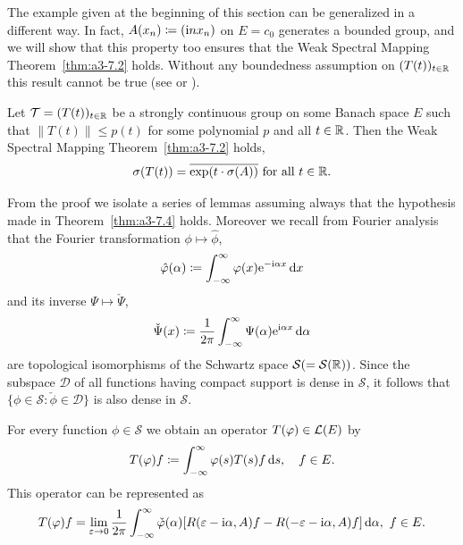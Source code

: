 The example given at the beginning of this section can be generalized in a different way.
In fact, $A(x_{n}) \coloneq (\mathrm{i} nx_{n})$ on $E = c_{0}$ generates a bounded group, and we will show that this property too ensures that the Weak Spectral Mapping Theorem~\ref{thm:a3-7.2} holds.
Without any boundedness assumption on $(T(t))_{t\in\mathbb{R}}$ this result cannot be true (see \textcite[Sec.23.16]{hillephillips:1957} or \textcite{wolff:1981}).
\begin{theorem}\label{thm:a3-7.4}
Let $\mathcal{T} = (T(t))_{t\in\mathbb{R}}$ be a strongly continuous group on some Banach space $E$ such that $\|T(t)\| \leq p(t)$ for some polynomial $p$ and all $t \in \mathbb{R}$.
Then the Weak Spectral Mapping Theorem~\ref{thm:a3-7.2} holds, \ie 
\[
\sigma(T(t)) = \overline{\exp(t\cdot\sigma(A))} \text{ for all } t \in \mathbb{R} .
\]
\end{theorem}
From the proof we isolate a series of lemmas assuming always that the hypothesis made in Theorem~\ref{thm:a3-7.4} holds.
Moreover we recall from Fourier analysis that the Fourier transformation $\phi \mapsto \hat{\phi}$,
\[
\hat{\phi}(\alpha) \coloneq \int_{-\infty}^{\infty} \phi(x)\eu^{-\im\alpha x} \dx
\]
and its inverse $\Psi \mapsto \check{\Psi}$,
\[
\check{\Psi}(x) \coloneq \frac{1}{2\pi}\int_{-\infty}^{\infty}\Psi(\alpha)\mathrm{e}^{\mathrm{i}\alpha x} 		\mathop{}\!\mathrm{d}{\alpha}
\]
are topological isomorphisms of the Schwartz space $\mathcal{S} ( = \mathcal{S}(\mathbb{R}))$.
Since the subspace $\mathcal{D}$ of all functions having compact support is dense in $\mathcal{S}$, it follows that $\{\phi \in \mathcal{S} \colon \check{\phi} \in \mathcal{D}\}$ is also dense in $\mathcal{S}$.
\begin{lemma}\label{lem:a3-7.5}
For every function $\phi \in \mathcal{S}$ we obtain an operator $T(\phi) \in \LE$ by
\[
T(\phi)f \coloneq \int_{-\infty}^{\infty} \phi(s)T(s)f \ds, \quad f \in E .
\]
This operator can be represented as
\begin{equation}\label{eq:a3-7.3}
T(\phi)f = \lim_{\epsilon\to 0} \frac{1}{2\pi}\int_{-\infty}^{\infty} \check{\phi}(\alpha)[R(\epsilon-\im\alpha,A)f - R(-\epsilon-\im\alpha,A)f] \diff{\alpha}, \ f \in E .
\end{equation}
\end{lemma}
